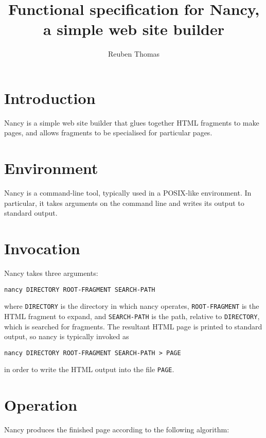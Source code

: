 \documentclass[english]{scrartcl}
\begin{document}
\title{Functional specification for Nancy, a simple web site builder}\date{\relax}\author{Reuben Thomas}\maketitle

\section*{Introduction}

Nancy is a simple web site builder that glues together HTML fragments to make pages, and allows fragments to be specialised for particular pages.

\section*{Environment}

Nancy is a command-line tool, typically used in a POSIX-like environment. In particular, it takes arguments on the command line and writes its output to standard output.

\section*{Invocation}

Nancy takes three arguments:

\begin{verbatim}nancy DIRECTORY ROOT-FRAGMENT SEARCH-PATH
\end{verbatim}

where \texttt{DIRECTORY} is the directory in which nancy operates, \texttt{ROOT-FRAGMENT} is the HTML fragment to expand, and \texttt{SEARCH-PATH} is the path, relative to \texttt{DIRECTORY}, which is searched for fragments. The resultant HTML page is printed to standard output, so nancy is typically invoked as

\begin{verbatim}nancy DIRECTORY ROOT-FRAGMENT SEARCH-PATH > PAGE
\end{verbatim}

in order to write the HTML output into the file \texttt{PAGE}.

\section*{Operation}

Nancy produces the finished page according to the following algorithm:
\end{document}
